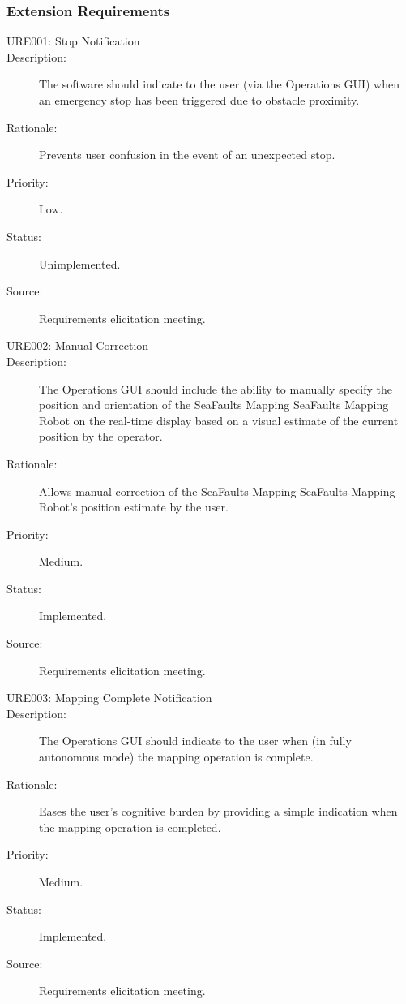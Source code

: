 \documentclass[12pt]{article}
\begin{document}
\subsubsection{Extension Requirements}
\begin{description}
\item [{URE001: Stop Notification}\label{URE001}] 
\item [{Description: }\label{Description}] The software should indicate to the user (via the Operations GUI) when an emergency stop has been triggered due to obstacle proximity.
\item[{Rationale: }\label{Rationale}] Prevents user confusion in the event of an unexpected stop.
\item[{Priority: }\label{Priority}] Low.
\item[{Status: }\label{Status}] Unimplemented.
\item[{Source: }\label{Source}] Requirements elicitation meeting.

\item [{URE002: Manual Correction}\label{URE002}] 
\item [{Description: }\label{Description}]The Operations GUI should include the ability to manually specify the position and orientation of the SeaFaults Mapping SeaFaults Mapping Robot on the real-time display based on a visual estimate of the current position by the operator.
\item[{Rationale: }\label{Rationale}] Allows manual correction of the SeaFaults Mapping SeaFaults Mapping Robot's position estimate by the user.
\item[{Priority: }\label{Priority}] Medium.
\item[{Status: }\label{Status}] Implemented.
\item[{Source: }\label{Source}] Requirements elicitation meeting.

\item [{URE003: Mapping Complete Notification}\label{URE003}] 
\item [{Description: }\label{Description}] The Operations GUI should indicate to the user when (in fully autonomous mode) the mapping operation is complete. 
\item[{Rationale: }\label{Rationale}] Eases the user's cognitive burden by providing a simple indication when the mapping operation is completed.
\item[{Priority: }\label{Priority}] Medium.
\item[{Status: }\label{Status}] Implemented.
\item[{Source: }\label{Source}] Requirements elicitation meeting.


\end{description}
\end{document}
